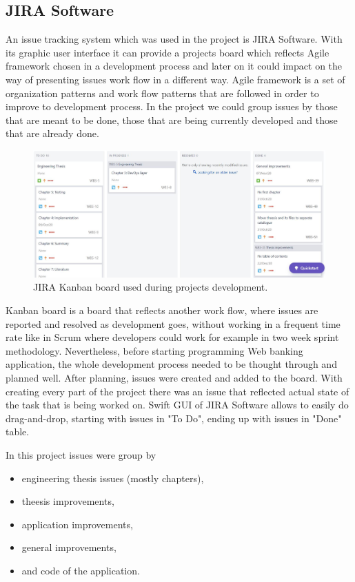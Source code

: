 \documentclass[a4paper,12pt]{book}
\newcommand\tab[1][1cm]{\hspace*{#1}}
\begin{document}
\subsection{JIRA Software}
{
\tab An issue tracking system which was used in the project is JIRA Software. With its graphic user interface it can provide a projects board  which reflects Agile framework chosen in a development process and later on it could impact on the way of presenting issues work flow in a different way. Agile framework is a set of organization patterns and work flow patterns that are followed in order to improve to development process. In the project we could group issues by those that are meant to be done, those that are being currently developed and those that are already done.

\bigskip
\begin{figure}[H]
  \centering
    \includegraphics[width=1.0\textwidth]{kanban}
    \caption{JIRA Kanban board used during projects development.~\cite{jiraboard}}
\end{figure} 
    
\bigskip Kanban board is a board that reflects another work flow, where issues are reported and resolved as development goes, without working in a frequent time rate like in Scrum where developers could work for example in two week sprint methodology. Nevertheless, before starting programming Web banking application, the whole development process needed to be thought through and planned well. After planning, issues were created and added to the board. With creating every part of the project there was an issue that reflected actual state of the task that is being worked on. Swift GUI of JIRA Software allows to easily do drag-and-drop, starting with issues in "To Do", ending up with issues in "Done" table.
    
\bigskip
In this project issues were group by
\begin{itemize}
	\item engineering thesis issues (mostly chapters),
	\item theesis improvements,
	\item application improvements,
	\item general improvements,
	\item and code of the application.
\end{itemize}
	
}
\end{document}
